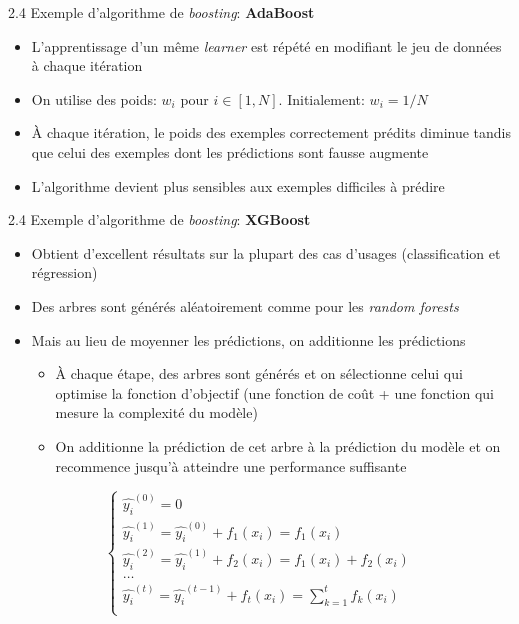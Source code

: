 \begin{frame}{2.4 Exemple d'algorithme de \textit{boosting}: \textbf{AdaBoost}}
  \begin{itemize}
  \item L'apprentissage d'un même \textit{learner} est répété en modifiant le jeu de données à chaque itération
  \item On utilise des poids: $w_{i}$ pour $i \in [1,N]$. Initialement: $w_{i} = 1/N$
  \item À chaque itération, le poids des exemples correctement prédits diminue tandis que celui des exemples dont les prédictions sont fausse augmente
  \item L'algorithme devient plus sensibles aux exemples difficiles à prédire
  \end{itemize}
\end{frame}

\begin{frame}{2.4 Exemple d'algorithme de \textit{boosting}: \textbf{XGBoost}}
  \begin{itemize}
  \item Obtient d'excellent résultats sur la plupart des cas d'usages (classification et régression)
  \item Des arbres sont générés aléatoirement comme pour les \textit{random forests}
  \item Mais au lieu de moyenner les prédictions, on additionne les prédictions
    \begin{itemize}
    \item À chaque étape, des arbres sont générés et on sélectionne celui qui optimise la fonction d'objectif (une fonction de coût + une fonction qui mesure la complexité du modèle)
    \item On additionne la prédiction de cet arbre à la prédiction du modèle et on recommence jusqu'à atteindre une performance suffisante
    \end{itemize}
  \end{itemize}
  \begin{equation*}
    \begin{cases}
      \hat{y_{i}}^{(0)} = 0 \\
      \hat{y_{i}}^{(1)} = \hat{y_{i}}^{(0)} + f_{1}(x_{i}) = f_{1}(x_{i})\\
      \hat{y_{i}}^{(2)} = \hat{y_{i}}^{(1)} + f_{2}(x_{i}) = f_{1}(x_{i}) + f_{2}(x_{i})\\
      \dots\\
      \hat{y_{i}}^{(t)} = \hat{y_{i}}^{(t-1)} + f_{t}(x_{i}) = \displaystyle\sum_{k=1}^{t} f_{k}(x_{i}) \\
    \end{cases}
  \end{equation*}
\end{frame}


